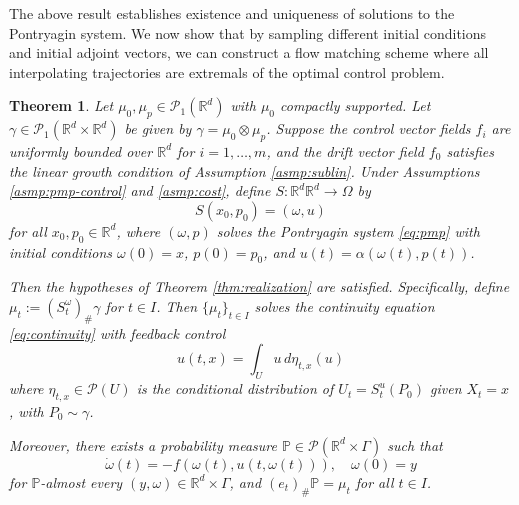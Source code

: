 \documentclass{article}
\newtheorem{theorem}{Theorem}[section]
\newcommand{\Rd}{\mathbb{R}^d}
\begin{document}
The above result establishes existence and uniqueness of solutions to the Pontryagin system. We now show that by sampling different initial conditions and initial adjoint vectors, we can construct a flow matching scheme where all interpolating trajectories are extremals of the optimal control problem.

\begin{theorem}
\label{thm:pmp-flow}
Let $\mu_0,\mu_p \in \mathcal{P}_1(\Rd)$ with $\mu_0$ compactly supported. Let $\gamma \in \mathcal{P}_1(\Rd \times \Rd)$ be given by $\gamma = \mu_0 \otimes \mu_p$. Suppose the control vector fields $f_i$ are uniformly bounded over $\mathbb{R}^d$ for $i = 1,\ldots,m$, and the drift vector field $f_0$ satisfies the linear growth condition of Assumption \ref{asmp:sublin}. Under Assumptions \ref{asmp:pmp-control} and \ref{asmp:cost}, define $S: \mathbb{R}^d \Rd \rightarrow \Omega$ by  
\[S(x_0,p_0) = (\omega,u)\] 
for all $x_0 , p_0 \in \mathbb{R}^d$, where $(\omega,p)$ solves the Pontryagin system \eqref{eq:pmp} with initial conditions $\omega(0) = x$, $p(0) = p_0$, and $u(t) = \alpha(\omega(t),p(t))$.

Then the hypotheses of Theorem \ref{thm:realization} are satisfied. Specifically, define $\mu_t := (S^{\omega}_t)_{\#}\gamma$ for $t \in I$. Then $\{\mu_t\}_{t \in I}$ solves the continuity equation \eqref{eq:continuity} with feedback control
\[u(t,x) = \int_{U} u \, d\eta_{t,x}(u)\]
where $\eta_{t,x} \in \mathcal{P}(U)$ is the conditional distribution of $U_t = S^u_t(P_0)$ given $X_t = x$, with $P_0 \sim \gamma$.

Moreover, there exists a probability measure $\mathbb{P} \in \mathcal{P}(\mathbb{R}^d \times \Gamma)$ such that 
\begin{equation}
\label{eq:reverse-flow}
\dot{\omega}(t) = -f(\omega(t), u(t,\omega(t))), \quad \omega(0) = y
\end{equation}
for $\mathbb{P}$-almost every $(y,\omega) \in \mathbb{R}^d \times \Gamma$, and $(e_t)_{\#}\mathbb{P} = \mu_t$ for all $t \in I$.
\end{theorem}
\end{document}
